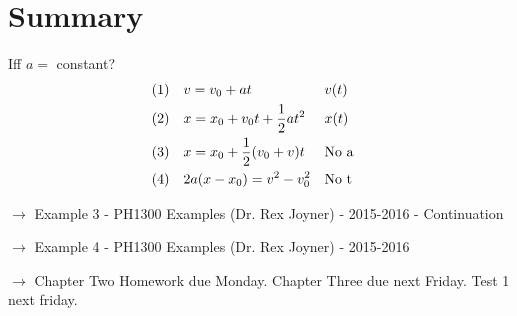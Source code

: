 \section{Summary}
	Iff $a = $ constant?
	\begin{align}
		&(1)& &v = v_{0} + at& &v(t)& \notag \\
		&(2)& &x = x_{0} + v_{0}t + \frac{1}{2}at^{2}& &x(t)& \notag \\
		&(3)& &x = x_{0} + \frac{1}{2}(v_{0}+v)t& &\text{No a}& \notag \\
		&(4)& &2a(x-x_{0}) = v^{2} - v_{0}^{2}& &\text{No t}& \notag
	\end{align}

$\to$ Example 3 - PH1300 Examples (Dr. Rex Joyner) - 2015-2016 - Continuation

$\to$ Example 4 - PH1300 Examples (Dr. Rex Joyner) - 2015-2016

$\to$ Chapter Two Homework due Monday. Chapter Three due next Friday. Test 1 next friday.
